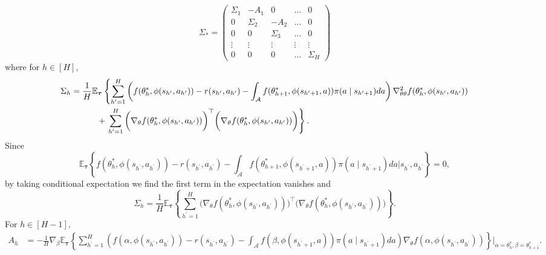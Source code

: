 \documentclass{article}
\numberwithin{equation}{section}
\theoremstyle{plain}
\theoremstyle{definition}
\theoremstyle{remark}
\begin{document}
\begin{equation*}\label{expression_Sigma}
    \Sigma_* = \begin{pmatrix}
    \Sigma_{1} & -A_1 & 0 & \ldots & 0 \\
    0 & \Sigma_2 & -A_2 & \ldots & 0 \\
    0 & 0 & \Sigma_3 & \ldots & 0\\
    \vdots & \vdots & \vdots & \vdots & \vdots \\
    0 & 0 & 0 & \ldots & \Sigma_H
    \end{pmatrix}
\end{equation*}
where for $h \in [H],$
\begin{align}
    &\Sigma_h
    = \frac{1}{H} \mathbb{E}_{\boldsymbol{\tau}} \left\{\sum_{h^{\prime}=1}^{H} \left(f(\theta_h^*,\phi(s_{h^{\prime}},a_{h^{\prime}})) -  r(s_{h^{\prime}},a_{h^{\prime}}) - \int_{\mathcal{A}} f(\theta_{h+1}^*,\phi(s_{h^{\prime}+1},a)) \pi(a \mid s_{h^{\prime}+1}) d a\right)\nabla_{\theta \theta}^2 f(\theta_h^*,\phi(s_{h^{\prime}},a_{h^{\prime}}))\right. \notag \\
    & \hspace{10ex}+\left.\sum_{h^{\prime}=1}^{H} \bigg(\nabla_{\theta} f(\theta_h^*,\phi(s_{h^{\prime}},a_{h^{\prime}}))\bigg)^{\top} \bigg(\nabla_{\theta} f(\theta_h^*,\phi(s_{h^{\prime}},a_{h^{\prime}}))\bigg)\right\}. \notag
\end{align}
Since 
\begin{equation*}
    \mathbb{E}_{\boldsymbol{\tau}} \left\{ f(\theta_h^*,\phi(s_{h^{\prime}},a_{h^{\prime}})) - r(s_{h^{\prime}},a_{h^{\prime}}) - \int_{\mathcal{A}} f(\theta_{h+1}^*,\phi(s_{h^{\prime}+1},a)) \pi(a \mid s_{h^{\prime}+1}) d a \bigg| s_{h^{\prime}}, a_{h^{\prime}}\right\} = 0,
\end{equation*}
by taking conditional expectation we find the first term in the expectation vanishes and 
\begin{equation}\label{appendix_definition_Sigma_h}
    \Sigma_h
    = \frac{1}{H} \mathbb{E}_{\boldsymbol{\tau}} \left\{\sum_{h^{\prime}=1}^{H} \bigg(\nabla_{\theta} f(\theta_h^*,\phi(s_{h^{\prime}},a_{h^{\prime}}))\bigg)^{\top} \bigg(\nabla_{\theta} f(\theta_h^*,\phi(s_{h^{\prime}},a_{h^{\prime}}))\bigg)\right\}.
\end{equation}
For $h \in [H-1],$
\begin{align*}\label{expression_A}
    A_h 
    &= - \frac{1}{H}\nabla_{\beta} \mathbb{E}_{\boldsymbol{\tau}} \left\{ \sum_{h^{\prime}=1}^H \left(f(\alpha, \phi(s_{h^{\prime}},a_{h^{\prime}})) -  r(s_{h^{\prime}},a_{h^{\prime}}) - \int_{\mathcal{A}} f(\beta,\phi(s_{h^{\prime}+1},a)) \pi(a \mid s_{h^{\prime}+1}) d a\right)\nabla_{\theta} f(\alpha,\phi(s_{h^{\prime}},a_{h^{\prime}})) \right\}\bigg|_{\alpha = \theta_h^*, \beta = \theta_{h+1}^*}.
\end{align*} 
\end{document}
